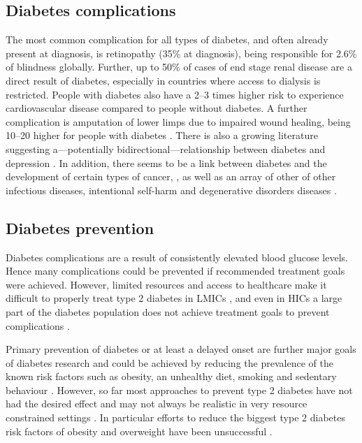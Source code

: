 \subsection{Diabetes complications}

The most common complication for all types of diabetes, and often already present at diagnosis, is retinopathy (35\% at diagnosis), being responsible for 2.6\% of blindness globally. Further, up to 50\% of cases of end stage renal disease are a direct result of diabetes, especially in countries where access to dialysis is restricted. People with diabetes also have a 2--3 times higher risk to experience cardiovascular disease compared to people without diabetes. A further complication is amputation of lower limps due to impaired wound healing, being 10--20 higher for people with diabetes \parencite{WorldHealthOrganization2016}. There is also a growing literature suggesting a---potentially bidirectional---relationship between diabetes and depression \parencite{VanDooren2013,Nouwen2010,Roy2012}. In addition, there seems to be a link between diabetes and the development of certain types of cancer, \parencite{Tsilidis2015,Nead2015}, as well as an array of other of other infectious diseases, intentional self-harm and degenerative disorders diseases \parencite{Seshasai2011}.


\subsection{Diabetes prevention}

Diabetes complications are a result of consistently elevated blood glucose levels. Hence many complications could be prevented if recommended treatment goals were achieved. However, limited resources and access to healthcare make it difficult to properly treat type 2 diabetes in \acp{LMIC} \parencite{Villalpando2010}, and even in \acp{HIC} a large part of the diabetes population does not achieve treatment goals to prevent complications \parencite{DiabetesUK2012}. 

Primary prevention of diabetes or at least a delayed onset are further major goals of diabetes research and could be achieved by reducing the prevalence of the known risk factors such as obesity, an unhealthy diet, smoking and sedentary behaviour \parencite{WorldHealthOrganization2016}. However, so far most approaches to prevent type 2 diabetes have not had the desired effect and may not always be realistic in very resource constrained settings \parencite{White2016}. In particular efforts to reduce the biggest type 2 diabetes risk factors of obesity and overweight have been unsuccessful \parencite{Roberto2015}.

